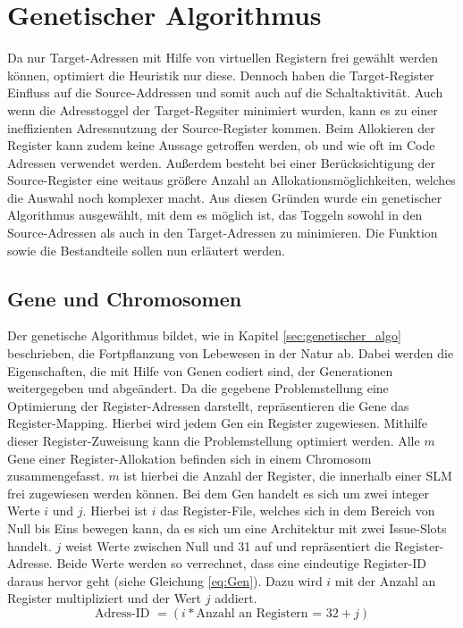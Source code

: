 \section{Genetischer Algorithmus}
\label{sec:genetischerAlgorithmus}
Da nur Target-Adressen mit Hilfe von virtuellen Registern frei gewählt werden können, optimiert die Heuristik nur diese. Dennoch haben die Target-Register Einfluss auf die Source-Addressen und somit auch auf die Schaltaktivität. Auch wenn die Adresstoggel der Target-Regsiter minimiert wurden, kann es zu einer ineffizienten Adressnutzung der Source-Register kommen. Beim Allokieren der Register kann zudem keine Aussage getroffen werden, ob und wie oft im Code Adressen verwendet werden. Außerdem besteht bei einer Berücksichtigung der Source-Register eine weitaus größere Anzahl an Allokationsmöglichkeiten, welches die Auswahl noch komplexer macht. Aus diesen Gründen wurde ein genetischer Algorithmus ausgewählt, mit dem es möglich ist, das Toggeln sowohl in den Source-Adressen als auch in den Target-Adressen zu minimieren. Die Funktion sowie die Bestandteile sollen nun erläutert werden.

\subsection{Gene und Chromosomen}
Der genetische Algorithmus bildet, wie in Kapitel \ref{sec:genetischer_algo} beschrieben, die Fortpflanzung von Lebewesen in der Natur ab. Dabei werden die Eigenschaften, die mit Hilfe von Genen codiert sind, der Generationen weitergegeben und abgeändert. Da die gegebene Problemstellung eine Optimierung der Register-Adressen darstellt, repräsentieren die Gene das Register-Mapping. Hierbei wird jedem Gen ein Register zugewiesen. Mithilfe dieser Register-Zuweisung kann die Problemstellung optimiert werden.
Alle $m$ Gene einer Register-Allokation befinden sich in einem Chromosom zusammengefasst. $m$ ist hierbei die Anzahl der Register, die innerhalb einer SLM frei zugewiesen werden können. Bei dem Gen handelt es sich um zwei integer Werte $i$ und $j$. Hierbei ist $i$ das Register-File, welches sich in dem Bereich von Null bis Eins bewegen kann, da es sich um eine Architektur mit zwei Issue-Slots handelt. $j$ weist Werte zwischen Null und 31 auf und repräsentiert die Register-Adresse. Beide Werte werden so verrechnet, dass eine eindeutige Register-ID daraus hervor geht (siehe Gleichung \ref{eq:Gen}). Dazu wird $i$ mit der Anzahl an Register multipliziert und der Wert $j$ addiert. 
\begin{equation}
\text{Adress-ID }= (i* \text{Anzahl an Registern = 32}+ j)
\label{eq:Gen}
\end{equation}
 
